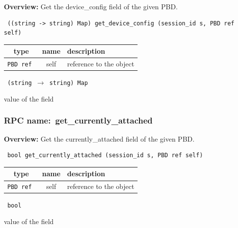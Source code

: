 {\bf Overview:} 
Get the device\_config field of the given PBD.

\begin{verbatim} ((string -> string) Map) get_device_config (session_id s, PBD ref self)\end{verbatim}



 
\vspace{0.3cm}
\begin{tabular}{|c|c|p{7cm}|}
 \hline
{\bf type} & {\bf name} & {\bf description} \\ \hline
{\tt PBD ref } & self & reference to the object \\ \hline 

\end{tabular}

\vspace{0.3cm}

{\tt 
(string $\rightarrow$ string) Map
}


value of the field
\vspace{0.3cm}
\vspace{0.3cm}
\vspace{0.3cm}
\subsubsection{RPC name:~get\_currently\_attached}

{\bf Overview:} 
Get the currently\_attached field of the given PBD.

\begin{verbatim} bool get_currently_attached (session_id s, PBD ref self)\end{verbatim}



 
\vspace{0.3cm}
\begin{tabular}{|c|c|p{7cm}|}
 \hline
{\bf type} & {\bf name} & {\bf description} \\ \hline
{\tt PBD ref } & self & reference to the object \\ \hline 

\end{tabular}

\vspace{0.3cm}

{\tt 
bool
}


value of the field
\vspace{0.3cm}
\vspace{0.3cm}
\vspace{0.3cm}
